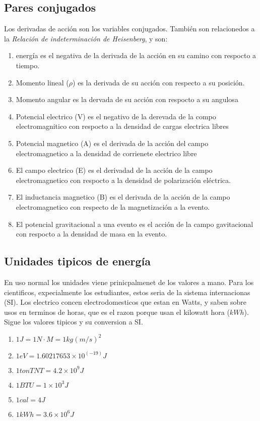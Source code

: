 \documentclass[11pt]{article}
\begin{document}
\subsection{Pares conjugados}
Los derivadas de acci\'on son los variables conjugados. Tambi\'en son relacionedos a la \emph{Relación de indeterminación de Heisenberg}, y son:
\begin{enumerate}
	\item energ\'ia es el negativa de la derivada de la acci\'on en su camino con respocto a tiempo.
	\item Momento lineal ($\rho$) es la derivada de su acci\'on con respecto a su posici\'on.
	\item Momento angular  es la dervada de su acci\'on con respocto a su angulosa
	\item Potencial electrico (V) es el negativo de la derevada de la compo electromagnitico con respocto a la densidad de cargas electrica libres
	\item Potencial magnetico (A) es el derivada de la acci\'on del campo electromagnetico a la densidad de corrienete electrico libre
	\item El campo electrico (E) es el derivadad de la acci\'on de la campo electromagnetico con respocto a la densidad de polarización eléctrica.
	\item El inductancia magnetico (B) es el derivada de la acci\'on de la campo electromagnetico con respecto de la magnetizaci\'on a la evento.
	\item El potencial gravitacional a una evento es el acci\'on de la campo gavitacional con respocto a la densidad de masa en la evento.
\end{enumerate}


\subsection{Unidades tipicos de energ\'ia}

En uso normal los unidades viene prinicpalmenet de los valores a mano. Para los cientificos, expecialmente los estudiantes, estos seria de la sistema internacionas (SI). Los electrico concen electrodomesticos que estan en Watts, y saben sobre usos en terminos de horas, que es el razon porque usan el kilowatt hora ($kWh$). Sigue los valores tipicos y su conversion a SI.

\begin{enumerate}
	\item $1J=1N\cdot M=1 kg (m/s)^2$
	\item $1eV=1.60217653 \times 10^(-19)J $
	\item $1 ton TNT=4.2 \times 10^9 J$
	\item $1 BTU=1 \times 10^3 J$
	\item $1 cal=4J$
	\item $1 kWh=3.6 \times 10^6 J$
\end{enumerate}
\end{document}
